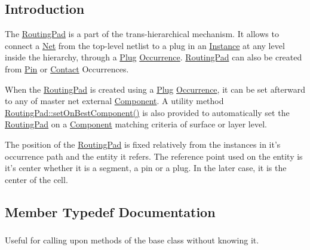 \hypertarget{classHurricane_1_1RoutingPad_secRoutingPadIntro}{}\subsection{Introduction}\label{classHurricane_1_1RoutingPad_secRoutingPadIntro}
The \hyperlink{classHurricane_1_1RoutingPad}{Routing\-Pad} is a part of the trans-\/hierarchical mechanism. It allows to connect a \hyperlink{classHurricane_1_1Net}{Net} from the top-\/level netlist to a plug in an \hyperlink{classHurricane_1_1Instance}{Instance} at any level inside the hierarchy, through a \hyperlink{classHurricane_1_1Plug}{Plug} \hyperlink{classHurricane_1_1Occurrence}{Occurrence}. \hyperlink{classHurricane_1_1RoutingPad}{Routing\-Pad} can also be created from \hyperlink{classHurricane_1_1Pin}{Pin} or \hyperlink{classHurricane_1_1Contact}{Contact} Occurrences.

When the \hyperlink{classHurricane_1_1RoutingPad}{Routing\-Pad} is created using a \hyperlink{classHurricane_1_1Plug}{Plug} \hyperlink{classHurricane_1_1Occurrence}{Occurrence}, it can be set afterward to any of master net external \hyperlink{classHurricane_1_1Component}{Component}. A utility method \hyperlink{classHurricane_1_1RoutingPad_a410992ef75c40f9a898c36f39a7d1a1a}{Routing\-Pad\-::set\-On\-Best\-Component()} is also provided to automatically set the \hyperlink{classHurricane_1_1RoutingPad}{Routing\-Pad} on a \hyperlink{classHurricane_1_1Component}{Component} matching criteria of surface or layer level.

The position of the \hyperlink{classHurricane_1_1RoutingPad}{Routing\-Pad} is fixed relatively from the instances in it's occurrence path and the entity it refers. The reference point used on the entity is it's center whether it is a segment, a pin or a plug. In the later case, it is the center of the cell. 

\subsection{Member Typedef Documentation}
\hypertarget{classHurricane_1_1RoutingPad_a53bed3713fe846a351621d2022bc6b68}{
\subsubsection[{Inherit}]{}}\label{classHurricane_1_1RoutingPad_a53bed3713fe846a351621d2022bc6b68}
Useful for calling upon methods of the base class without knowing it. 


